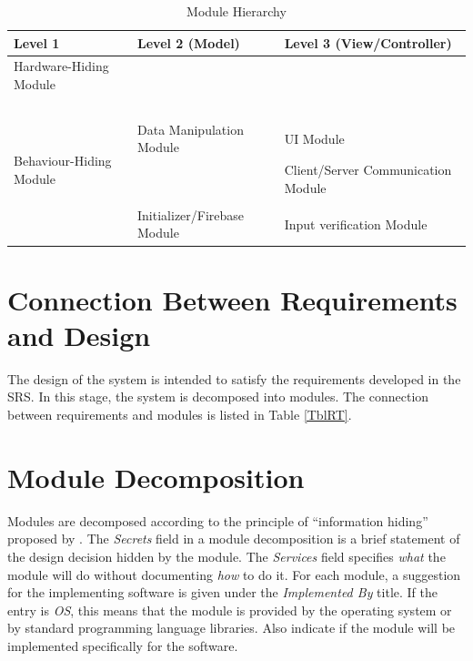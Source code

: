 \documentclass[12pt, titlepage]{article}
\begin{document}
\begin{table}[h!]
\centering
\begin{tabular}{p{} p{} p{}}
\toprule
\textbf{Level 1} & \textbf{Level 2} (Model) & \textbf{Level 3} (View/Controller)\\
\midrule

{Hardware-Hiding Module} & ~ \\
\midrule

\multirow{7}{0.3\textwidth}{Behaviour-Hiding Module} & ~ \\
& Data Manipulation Module & UI Module \\ & & Client/Server Communication Module \\
\midrule

\multirow{3}{0.3\textwidth}{Software Decision Module}\\
& Initializer/Firebase Module & Input verification Module  \\
\bottomrule

\end{tabular}
\caption{Module Hierarchy}
\label{TblMH}
\end{table}

\section{Connection Between Requirements and Design} \label{SecConnection}

The design of the system is intended to satisfy the requirements developed in
the SRS. In this stage, the system is decomposed into modules. The connection
between requirements and modules is listed in Table \ref{TblRT}.

\section{Module Decomposition} \label{SecMD}

Modules are decomposed according to the principle of ``information hiding''
proposed by \citet{ParnasEtAl1984}. The \emph{Secrets} field in a module
decomposition is a brief statement of the design decision hidden by the
module. The \emph{Services} field specifies \emph{what} the module will do
without documenting \emph{how} to do it. For each module, a suggestion for the
implementing software is given under the \emph{Implemented By} title. If the
entry is \emph{OS}, this means that the module is provided by the operating
system or by standard programming language libraries.  Also indicate if the
module will be implemented specifically for the software.
\end{document}

